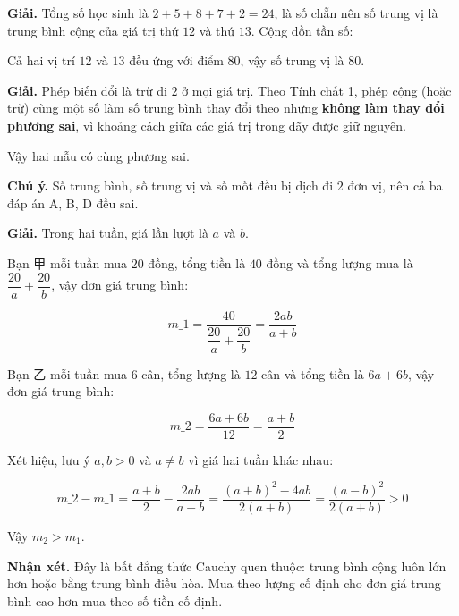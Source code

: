 \documentclass[11pt, a4paper]{article}
\begin{document}
\begin{dapan}[10 — Đáp án C]
\textbf{Giải.} Tổng số học sinh là $2 + 5 + 8 + 7 + 2 = 24$, là số chẵn nên số trung vị là trung bình cộng của giá trị thứ $12$ và thứ $13$. Cộng dồn tần số:


Cả hai vị trí $12$ và $13$ đều ứng với điểm $80$, vậy số trung vị là $80$.
\end{dapan}

\begin{dapan}[11 — Đáp án C]
\textbf{Giải.} Phép biến đổi là trừ đi $2$ ở mọi giá trị. Theo Tính chất 1, phép cộng (hoặc trừ) cùng một số làm số trung bình thay đổi theo nhưng \textbf{không làm thay đổi phương sai}, vì khoảng cách giữa các giá trị trong dãy được giữ nguyên.

Vậy hai mẫu có cùng phương sai.

\textbf{Chú ý.} Số trung bình, số trung vị và số mốt đều bị dịch đi $2$ đơn vị, nên cả ba đáp án A, B, D đều sai.
\end{dapan}

\begin{dapan}[12 — Đáp án C]
\textbf{Giải.} Trong hai tuần, giá lần lượt là $a$ và $b$.

Bạn 甲 mỗi tuần mua $20$ đồng, tổng tiền là $40$ đồng và tổng lượng mua là $\dfrac{20}{a} + \dfrac{20}{b}$, vậy đơn giá trung bình:

$$m\_1 = \frac{40}{\dfrac{20}{a} + \dfrac{20}{b}} = \frac{2ab}{a + b}$$

Bạn 乙 mỗi tuần mua $6$ cân, tổng lượng là $12$ cân và tổng tiền là $6a + 6b$, vậy đơn giá trung bình:

$$m\_2 = \frac{6a + 6b}{12} = \frac{a + b}{2}$$

Xét hiệu, lưu ý $a, b > 0$ và $a \neq b$ vì giá hai tuần khác nhau:

$$m\_2 - m\_1 = \frac{a+b}{2} - \frac{2ab}{a+b} = \frac{(a+b)^2 - 4ab}{2(a+b)} = \frac{(a-b)^2}{2(a+b)} > 0$$

Vậy $m_2 > m_1$.

\textbf{Nhận xét.} Đây là bất đẳng thức Cauchy quen thuộc: trung bình cộng luôn lớn hơn hoặc bằng trung bình điều hòa. Mua theo lượng cố định cho đơn giá trung bình cao hơn mua theo số tiền cố định.
\end{dapan}
\end{document}
